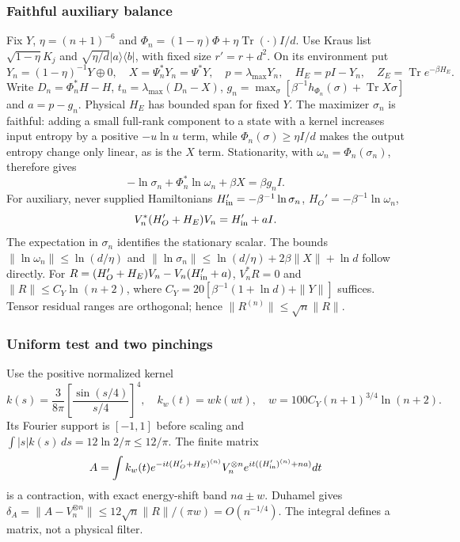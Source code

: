 \documentclass[11pt]{article}
\theoremstyle{definition}
\theoremstyle{remark}
\newcommand{\Tr}{\operatorname{Tr}}
\begin{document}
\subsubsection{Faithful auxiliary balance}
Fix $Y$, $\eta=(n+1)^{-6}$ and
$\Phi_n=(1-\eta)\Phi+\eta\Tr(\cdot)I/d$. Use Kraus list
$\sqrt{1-\eta}K_j$ and $\sqrt{\eta/d}|a\rangle\langle b|$, with fixed
size $r'=r+d^2$. On its environment put
\[
 Y_n=(1-\eta)^{-1}Y\oplus0,\quad X=\Psi_n^*Y_n=\Psi^*Y,\quad
 p=\lambda_{\max}Y_n,\quad H_E=pI-Y_n,\quad Z_E=\Tr e^{-\beta H_E}.
\]
Write $D_n=\Phi_n^*H-H$, $t_n=\lambda_{\max}(D_n-X)$,
$g_n=\max_\sigma[\beta^{-1}h_{\Phi_n}(\sigma)+\Tr X\sigma]$ and
$a=p-g_n$. Physical $H_E$ has bounded span for fixed $Y$.
The maximizer $\sigma_n$ is faithful: adding a small full-rank
component to a state with a kernel increases input entropy by a
positive $-u\ln u$ term, while $\Phi_n(\sigma)\ge\eta I/d$ makes the
output entropy change only linear, as is the $X$ term. Stationarity,
with $\omega_n=\Phi_n(\sigma_n)$, therefore gives
\[
 -\ln\sigma_n+\Phi_n^*\ln\omega_n+\beta X=\beta g_n I.
\]
For auxiliary, never supplied Hamiltonians
$H_{\rm in}'=-\beta^{-1}\ln\sigma_n$, $H_O'=-\beta^{-1}\ln\omega_n$,
\begin{equation}\label{bp-auxbalance}
 V_n^*(H_O'+H_E)V_n=H_{\rm in}'+aI.
\end{equation}
The expectation in $\sigma_n$ identifies the stationary scalar.
The bounds $\|\ln\omega_n\|\le\ln(d/\eta)$ and
$\|\ln\sigma_n\|\le\ln(d/\eta)+2\beta\|X\|+\ln d$ follow directly.
For $R=(H_O'+H_E)V_n-V_n(H_{\rm in}'+a)$, $V_n^*R=0$ and
$\|R\|\le C_Y\ln(n+2)$, where
$C_Y=20[\beta^{-1}(1+\ln d)+\|Y\|]$ suffices.
Tensor residual ranges are orthogonal; hence
$\|R^{(n)}\|\le\sqrt n\|R\|$.

\subsubsection{Uniform test and two pinchings}
Use the positive normalized kernel
\[
 k(s)=\frac3{8\pi}\left[\frac{\sin(s/4)}{s/4}\right]^4,\quad
 k_w(t)=wk(wt),\quad w=100C_Y(n+1)^{3/4}\ln(n+2).
\]
Its Fourier support is $[-1,1]$ before scaling and
$\int |s|k(s)\,ds=12\ln2/\pi\le12/\pi$. The finite matrix
\[
 A=\int k_w(t)e^{-it(H_O'+H_E)^{(n)}}V_n^{\otimes n}
                  e^{it((H_{\rm in}')^{(n)}+na)}dt
\]
is a contraction, with exact energy-shift band $na\pm w$.
Duhamel gives
$\delta_A=\|A-V_n^{\otimes n}\|\le12\sqrt n\|R\|/(\pi w)=O(n^{-1/4})$.
The integral defines a matrix, not a physical filter.
\end{document}
